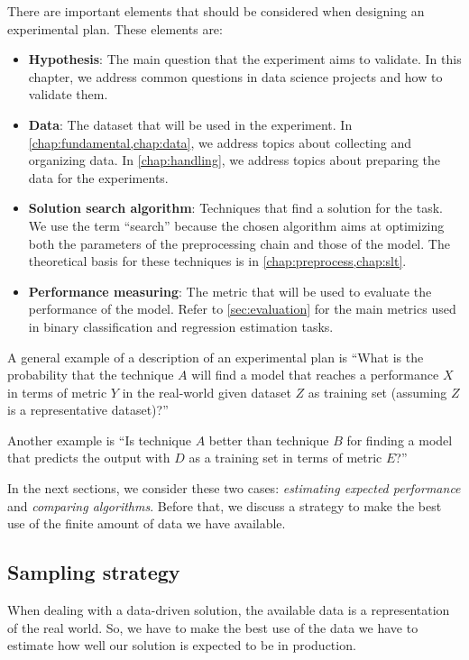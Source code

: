 There are important elements that should be considered when designing an experimental
plan.  These elements are:
\begin{itemize}
  \item \textbf{Hypothesis}: The main question that the experiment aims to validate.
    In this chapter, we address common questions in data science projects and how to
    validate them.
  \item \textbf{Data}: The dataset that will be used in the experiment.  In
    \cref{chap:fundamental,chap:data}, we address topics about collecting and organizing data.
    In \cref{chap:handling}, we address topics about preparing the data for the
    experiments.
  \item \textbf{Solution search algorithm}: Techniques that find a solution for the task.
    We use the term ``search'' because the chosen algorithm aims at optimizing both the
    parameters of the preprocessing chain and those of the model. The theoretical
    basis for these techniques is in \cref{chap:preprocess,chap:slt}.
  \item \textbf{Performance measuring}: The metric that will be used to evaluate the
    performance of the model.  Refer to \cref{sec:evaluation} for the main metrics used in
    binary classification and regression estimation tasks.
\end{itemize}

A general example of a description of an experimental plan is ``What is the probability that
the technique $A$ will find a model that reaches a performance $X$ in terms of metric $Y$ in
the real-world given dataset $Z$ as training set (assuming $Z$ is a representative
dataset)?''

Another example is ``Is technique $A$ better than technique $B$ for finding a model that
predicts the output with $D$ as a training set in terms of metric $E$?''

In the next sections, we consider these two cases: \emph{estimating expected performance}
and \emph{comparing algorithms}.  Before that, we discuss a strategy to make the best use
of the finite amount of data we have available.

\subsection{Sampling strategy}

When dealing with a data-driven solution, the available data is a representation of the
real world.  So, we have to make the best use of the data we have to estimate how well our
solution is expected to be in production.

